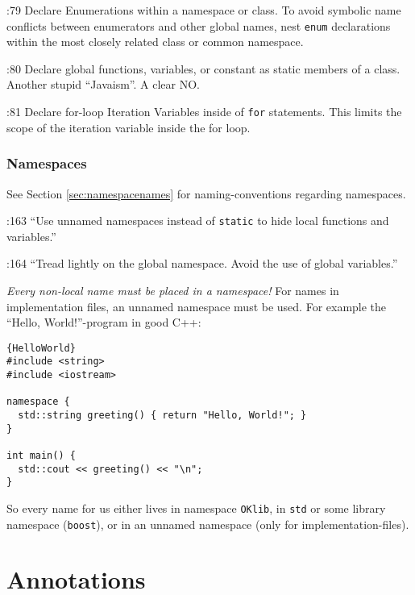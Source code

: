 \documentclass{book}
\newcommand{\name}[1]{\texttt{#1}}
\begin{document}
\cite{OKL_MisfeldtBumgardnerGray2004CppStyle}:79 Declare Enumerations within a namespace or class. To avoid symbolic name conflicts between enumerators and other global names, nest \name{enum} declarations within the most closely related class or common namespace. 

\cite{OKL_MisfeldtBumgardnerGray2004CppStyle}:80 Declare global functions, variables, or constant as static members of a class. Another stupid ``Javaism''. A clear NO.

\cite{OKL_MisfeldtBumgardnerGray2004CppStyle}:81 Declare for-loop Iteration Variables inside of \name{for} statements. This limits the scope of the iteration variable inside the for loop.




\subsection{Namespaces}
\label{sec:DeclarationsNamespaces}

See Section \ref{sec:namespacenames} for naming-conventions regarding namespaces.

\cite{OKL_MisfeldtBumgardnerGray2004CppStyle}:163 ``Use unnamed namespaces instead of \name{static} to hide local functions and variables.''

\cite{OKL_MisfeldtBumgardnerGray2004CppStyle}:164 ``Tread lightly on the global namespace. Avoid the use of global variables.''

\emph{Every non-local name must be placed in a namespace!} For names in implementation files, an unnamed namespace must be used. For example the ``Hello, World!''-program in good C++:
\begin{lstlisting}{HelloWorld}
#include <string>
#include <iostream>

namespace {
  std::string greeting() { return "Hello, World!"; }
}

int main() {
  std::cout << greeting() << "\n";
}
\end{lstlisting}
So every name for us either lives in namespace \name{OKlib}, in \name{std} or some library namespace (\name{boost}), or in an unnamed namespace (only for implementation-files).

 





\chapter{Annotations}
\label{cha:annotations}
\end{document}
